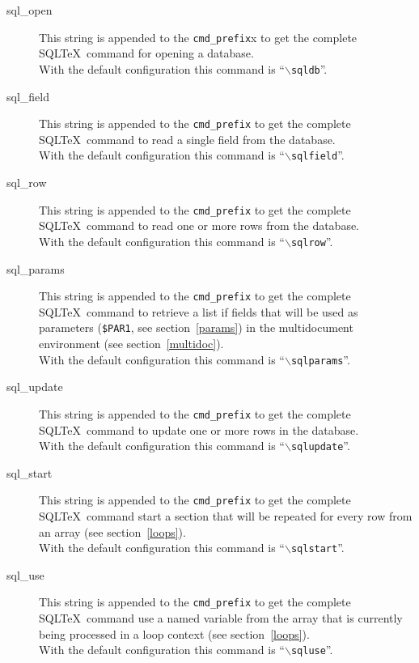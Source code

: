 \documentclass{article}
\newcommand{\bs}{\ensuremath{\backslash}}
\begin{document}
\begin{description}
\item[sql\_open] This string is appended to the \texttt{cmd\_prefix}x to
get the complete SQL\TeX\ command for opening a database.\\
With the default configuration this command is ``\texttt{\bs sqldb}''.

\item[sql\_field] This string is appended to the \texttt{cmd\_prefix} to
get the complete SQL\TeX\ command to read a single field from the database.\\
With the default configuration this command is ``\texttt{\bs sqlfield}''.

\item[sql\_row] This string is appended to the \texttt{cmd\_prefix} to
get the complete SQL\TeX\ command to read one or more rows from the database.\\
With the default configuration this command is ``\texttt{\bs sqlrow}''.

\item[sql\_params] This string is appended to the \texttt{cmd\_prefix} to get the complete SQL\TeX\ command to retrieve a list if fields that will be used as parameters (\texttt{\$PAR1}, see section~\ref{params}) in the multidocument environment (see section~\ref{multidoc}).\\
With the default configuration this command is ``\texttt{\bs sqlparams}''.

\item[sql\_update] This string is appended to the \texttt{cmd\_prefix}
to get the complete SQL\TeX\ command to update one or more rows in the database.\\
With the default configuration this command is ``\texttt{\bs sqlupdate}''.

\item[sql\_start] This string is appended to the \texttt{cmd\_prefix} to get the complete SQL\TeX\ command start a section that will be repeated for every row from an array (see section~\ref{loops}).\\
With the default configuration this command is ``\texttt{\bs sqlstart}''.

\item[sql\_use] This string is appended to the \texttt{cmd\_prefix} to get the complete SQL\TeX\ command use a named variable from the array that is currently being processed in a loop context (see section~\ref{loops}).\\
With the default configuration this command is ``\texttt{\bs sqluse}''.


\end{description}
\end{document}
